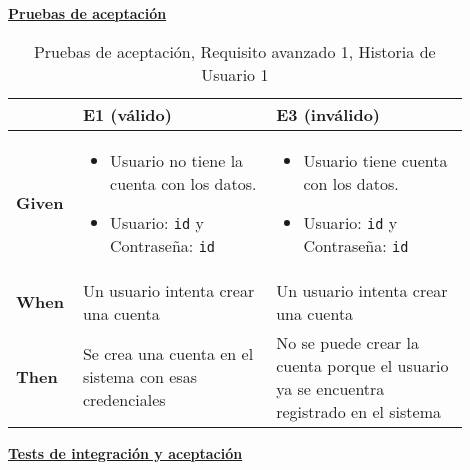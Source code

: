 \documentclass[../ei103948-project-documentation.tex]{subfiles}
\begin{document}
\begin{center}
					\textbf{\underline{Pruebas de aceptación}}
					\begin{table}[H]
						\centering
						\begin{tabular}{|p{0.10\linewidth}|p{0.40\linewidth}|p{0.40\linewidth}|}
							\hline
							\textbf{}      & \textbf{E1 (válido)}                                                            & \textbf{E3 (inválido)}                                                                 \\ \hline
							\textbf{Given} & 
							\begin{itemize}\vspace{-5mm}\setlength\itemsep{0mm}\setlength\parskip{0mm}\setlength{\itemindent}{-5mm}
								\item Usuario no tiene la cuenta con los datos.
								\item Usuario: \texttt{id} y Contraseña: \texttt{id}
							\end{itemize} & 
							\begin{itemize}\vspace{-5mm}\setlength\itemsep{0mm}\setlength\parskip{0mm}\setlength{\itemindent}{-5mm}
								\item Usuario tiene cuenta con los datos.
								\item Usuario: \texttt{id} y Contraseña: \texttt{id}
							\end{itemize} \\ \hline
							\textbf{When}  & Un usuario intenta crear una cuenta                                             & Un usuario intenta crear una cuenta                                                    \\ \hline
							\textbf{Then}  & Se crea una cuenta en el sistema con esas credenciales                          & No se puede crear la cuenta porque el usuario ya se encuentra registrado en el sistema \\ \hline
							\end{tabular}
						\caption{Pruebas de aceptación, Requisito avanzado 1, Historia de Usuario 1}
					\end{table}
					\end{center}

					\begin{center}
						\textbf{\underline{Tests de integración y aceptación}}
					\end{center}

					\testAvanzadoA

					\vspace*{5mm}
\end{document}
